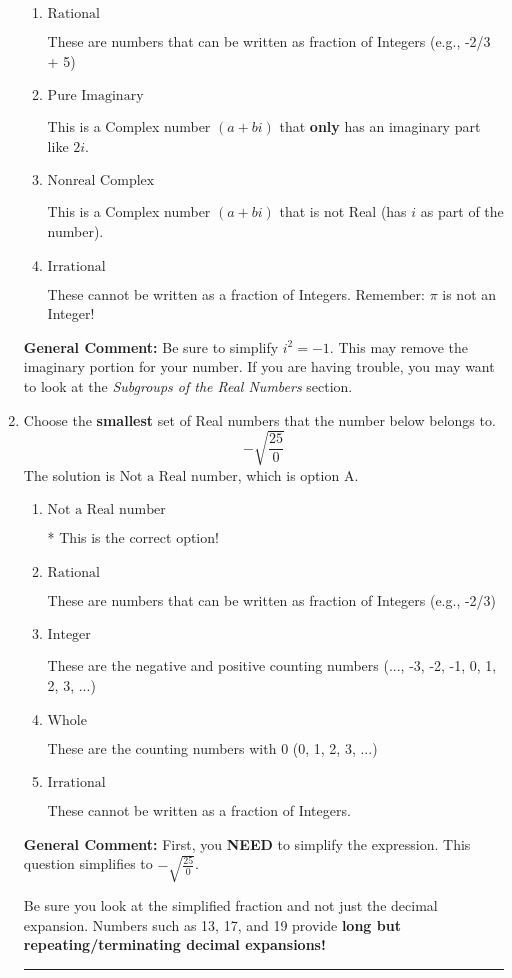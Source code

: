 \documentclass{extbook}[14pt]
\newcommand{\litem}[1]{\item #1

\rule{\textwidth}{0.4pt}}
\begin{document}
\begin{enumerate}
{\begin{enumerate}[label=\Alph*.]
* This is the correct option!
\item \( \text{Rational} \)

These are numbers that can be written as fraction of Integers (e.g., -2/3 + 5)
\item \( \text{Pure Imaginary} \)

This is a Complex number $(a+bi)$ that \textbf{only} has an imaginary part like $2i$.
\item \( \text{Nonreal Complex} \)

This is a Complex number $(a+bi)$ that is not Real (has $i$ as part of the number).
\item \( \text{Irrational} \)

These cannot be written as a fraction of Integers. Remember: $\pi$ is not an Integer!
\end{enumerate}

\textbf{General Comment:} Be sure to simplify $i^2 = -1$. This may remove the imaginary portion for your number. If you are having trouble, you may want to look at the \textit{Subgroups of the Real Numbers} section.
}
\litem{
Choose the \textbf{smallest} set of Real numbers that the number below belongs to.
\[ -\sqrt{\frac{25}{0}} \]The solution is \( \text{Not a Real number} \), which is option A.\begin{enumerate}[label=\Alph*.]
\item \( \text{Not a Real number} \)

* This is the correct option!
\item \( \text{Rational} \)

These are numbers that can be written as fraction of Integers (e.g., -2/3)
\item \( \text{Integer} \)

These are the negative and positive counting numbers (..., -3, -2, -1, 0, 1, 2, 3, ...)
\item \( \text{Whole} \)

These are the counting numbers with 0 (0, 1, 2, 3, ...)
\item \( \text{Irrational} \)

These cannot be written as a fraction of Integers.
\end{enumerate}

\textbf{General Comment:} First, you \textbf{NEED} to simplify the expression. This question simplifies to $-\sqrt{\frac{25}{0}}$. 
 
 Be sure you look at the simplified fraction and not just the decimal expansion. Numbers such as 13, 17, and 19 provide \textbf{long but repeating/terminating decimal expansions!} 
 
}
\end{enumerate}
\end{document}
